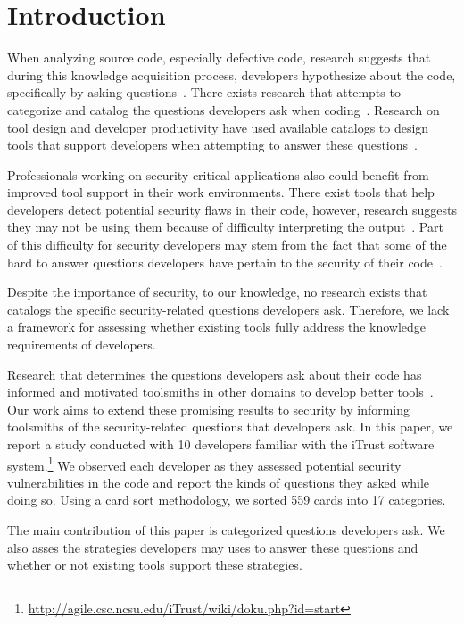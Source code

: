 \documentclass[conference]{IEEEtran}
\begin{document}
\section{Introduction}

When analyzing source code, especially defective code, research suggests that during this knowledge acquisition process, developers hypothesize about the code, specifically by asking questions~\cite{livshits2005finding, ko2004designing}. 
There exists research that attempts to categorize and catalog the questions developers ask when coding~\cite{latoza2010hard}. 
Research on tool design and developer productivity have used available catalogs to design tools that support developers when attempting to answer these questions~\cite{yoon2013visualization, servant2012history}.

 
Professionals working on security-critical applications also could benefit from improved tool support in their work environments. 
There exist tools that help developers detect potential security flaws in their code, however, research suggests they may not be using them because of difficulty interpreting the output~\cite{johnson2013don}. 
Part of this difficulty for security developers may stem from the fact that some of the hard to answer questions developers have pertain to the security of their code~\cite{latoza2010hard}.

Despite the importance of security, to our knowledge, no research exists that catalogs the specific security-related questions developers ask. 
Therefore, we lack a framework for assessing whether existing tools fully address the knowledge requirements of developers.

Research that determines the questions developers ask about their code has informed and motivated toolsmiths in other domains to develop better tools~\cite{kononenko2012automatically, servant2012history, yoon2013visualization}.
Our work aims to extend these promising results to security by informing toolsmiths of the security-related questions that developers ask.
In this paper, we report a study conducted with 10 developers familiar with the iTrust software system.\footnote{\url{http://agile.csc.ncsu.edu/iTrust/wiki/doku.php?id=start}} 
We observed each developer as they assessed potential security vulnerabilities in the code and report the kinds of questions they asked while doing so. Using a card sort methodology, we sorted 559 cards into 17 categories. 

The main contribution of this paper is categorized questions developers ask. We also asses the strategies developers may uses to answer these questions and whether or not existing tools support these strategies.
\end{document}
